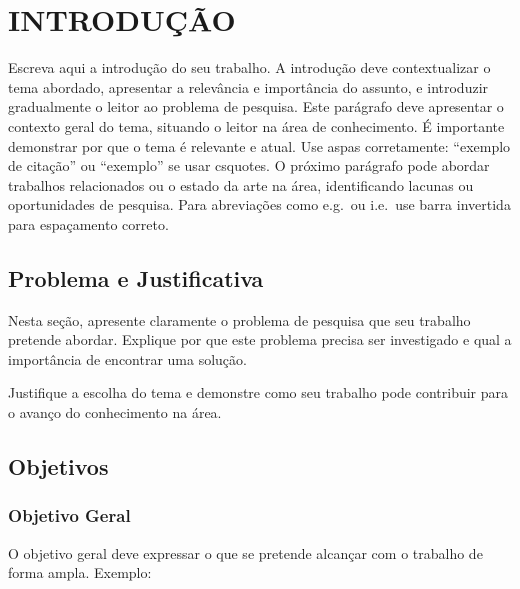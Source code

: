 \documentclass[12pt, a4paper, brazil, oneside]{abntex2}
\begin{document}

\chapter{INTRODUÇÃO}


Escreva aqui a introdução do seu trabalho. A introdução deve contextualizar o tema abordado, apresentar a relevância e importância do assunto, e introduzir gradualmente o leitor ao problema de pesquisa.
%
Este parágrafo deve apresentar o contexto geral do tema, situando o leitor na área de conhecimento. É importante demonstrar por que o tema é relevante e atual. Use aspas corretamente: ``exemplo de citação'' ou \enquote{exemplo} se usar csquotes.
%
O próximo parágrafo pode abordar trabalhos relacionados ou o estado da arte na área, identificando lacunas ou oportunidades de pesquisa. Para abreviações como e.g.\ ou i.e.\, use barra invertida para espaçamento correto.

\section{Problema e Justificativa}

Nesta seção, apresente claramente o problema de pesquisa que seu trabalho pretende abordar. Explique por que este problema precisa ser investigado e qual a importância de encontrar uma solução.

Justifique a escolha do tema e demonstre como seu trabalho pode contribuir para o avanço do conhecimento na área.

\section{Objetivos}

\subsection{Objetivo Geral}

O objetivo geral deve expressar o que se pretende alcançar com o trabalho de forma ampla. Exemplo:
\end{document}
